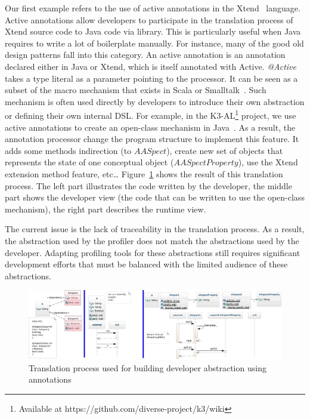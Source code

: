 Our first example refers to the use of active annotations in the Xtend~\cite{bettini2013implementing} language.
Active annotations allow developers to participate in the translation process of Xtend source code to Java code via library.
This is particularly useful when Java requires to write a lot of boilerplate manually. 
For instance, many of the good old design patterns fall into this category. 
An active annotation is an annotation declared either in Java or Xtend, which is itself annotated with Active. 
\textit{@Active} takes a type literal as a parameter pointing to the processor. 
It can be seen as a subset of the macro mechanism that exists in Scala or Smalltalk~\cite{burmako2013scala}. 
Such mechanism is often used directly by developers to introduce their own abstraction or defining their own internal DSL. 
For example, in the K3-AL\footnote{Available at https://github.com/diverse-project/k3/wiki} project, we use active annotations to create an open-class mechanism in Java~\cite{Clifton:2000:MMO:353171.353181}. 
As a result, the annotation processor change the program structure to implement this feature. 
It adds some methods indirection (to $AASpect$), create new set of objects that represents the state of one conceptual object ($AASpectProperty$), use the Xtend extension method feature, etc\dots 
Figure~\ref{fig:famous} shows the result of this translation process. 
The left part illustrates the code written by the developer, the middle part shows the developer view (the code that can be written to use the open-class mechanism), the right part describes the runtime view. 
 
The current issue is the lack of traceability in the translation process. 
As a result, the abstraction used by the profiler does not match the abstractions used by the developer. 
Adapting profiling tools for these abstractions still requires significant development efforts that must be balanced with the limited audience of these abstractions.

\begin{figure}
\centering
\includegraphics[width=0.9\linewidth]{chapter6/fig/famous}
\caption{Translation process used for building developer abstraction using annotations}
\label{fig:famous}
\end{figure}

